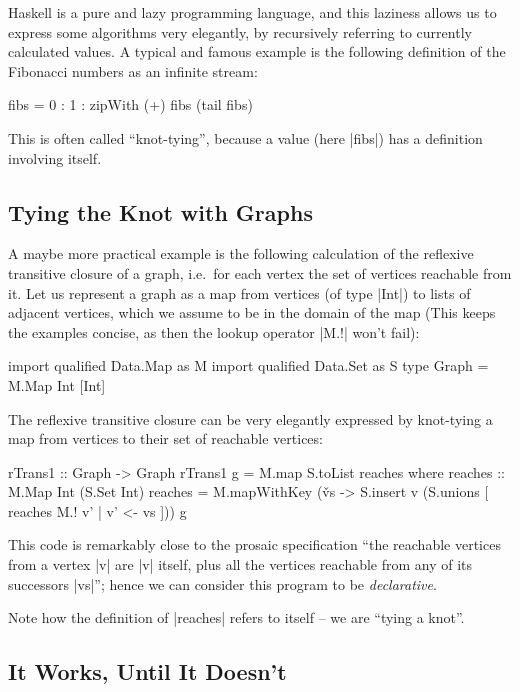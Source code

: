 \documentclass[manuscript,screen,acmsmall,nonacm]{acmart}
\begin{document}
Haskell is a pure and lazy programming language, and this laziness allows us to express some algorithms very elegantly, by recursively referring to currently calculated values.
A typical and famous example is the following definition of the Fibonacci numbers as an infinite stream:
\begin{code}
fibs = 0 : 1 : zipWith (+) fibs (tail fibs)
\end{code}
This is often called “knot-tying”, because a value (here |fibs|) has a definition involving itself.

\subsection{Tying the Knot with Graphs}

A maybe more practical example is the following calculation of the reflexive transitive closure of a graph, i.e.\ for each vertex the set of vertices reachable from it.
Let us represent a graph as a map from vertices (of type |Int|) to lists of adjacent vertices, which we assume to be in the domain of the map (This keeps the examples concise, as then the lookup operator |M.!| won't fail):
\begin{code}
import qualified Data.Map as M
import qualified Data.Set as S
type Graph = M.Map Int [Int]
\end{code}

The reflexive transitive closure can be very elegantly expressed by knot-tying a map from vertices to their set of reachable vertices:
\begin{code}
rTrans1 :: Graph -> Graph
rTrans1 g = M.map S.toList reaches
  where
    reaches :: M.Map Int (S.Set Int)
    reaches = M.mapWithKey (\v vs -> S.insert v (S.unions [ reaches M.! v' | v' <- vs ])) g
\end{code}
This code is remarkably close to the prosaic specification “the reachable vertices from a vertex |v| are |v| itself, plus all the vertices reachable from any of its successors |vs|”; hence we can consider this program to be \emph{declarative}.

Note how the definition of |reaches| refers to itself -- we are “tying a knot”.

\subsection{It Works, Until It Doesn't}
\end{document}
